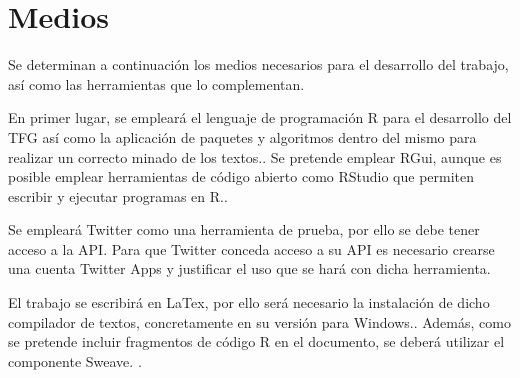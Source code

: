 \section{Medios}
\label{sec:medios}

Se determinan a continuación los medios necesarios para el desarrollo del trabajo, así como las 
herramientas que lo complementan.

En primer lugar, se empleará el lenguaje de programación R para el desarrollo del TFG así como la 
aplicación de paquetes y algoritmos dentro del mismo para realizar un correcto minado de los textos.\cite{r}.
Se pretende emplear RGui, aunque es posible emplear herramientas de código abierto como RStudio que permiten escribir y ejecutar 
programas en R.\cite{rstudio}.

Se empleará Twitter como una herramienta de prueba, por ello se debe tener acceso a la API. Para que 
Twitter conceda acceso a su API es necesario crearse una cuenta Twitter Apps y justificar el uso que se 
hará con dicha herramienta.\cite{api-twitter}

El trabajo se escribirá en LaTex, por ello será necesario la instalación de dicho compilador de textos, 
concretamente en su versión para Windows.\cite{miktext}. Además, como se pretende incluir fragmentos de código R en el documento, 
se deberá utilizar el componente Sweave. \cite{Sweave}.






% 







